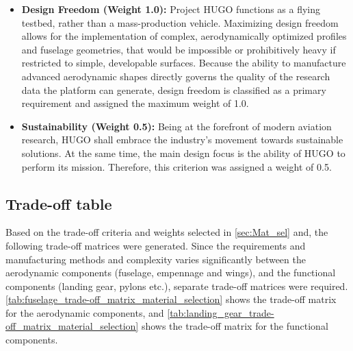 \begin{itemize}
    \item \textbf{Design Freedom (Weight 1.0):} Project HUGO functions as a flying testbed, rather than a mass-production vehicle. Maximizing design freedom allows for the implementation of complex, aerodynamically optimized profiles and fuselage geometries, that would be impossible or prohibitively heavy if restricted to simple, developable surfaces. Because the ability to manufacture advanced aerodynamic shapes directly governs the quality of the research data the platform can generate, design freedom is classified as a primary requirement and assigned the maximum weight of 1.0.

    \item \textbf{Sustainability (Weight 0.5):} Being at the forefront of modern aviation research, HUGO shall embrace the industry's movement towards sustainable solutions. At the same time, the main design focus is the ability of HUGO to perform its mission. Therefore, this criterion was assigned a weight of 0.5.
    \end{itemize}

\subsection{Trade-off table}

Based on the trade-off criteria and weights selected in \autoref{sec:Mat_sel} and, the following trade-off matrices were generated. Since the requirements and manufacturing methods and complexity varies significantly between the aerodynamic components (fuselage, empennage and wings), and the functional components (landing gear, pylons etc.), separate trade-off matrices were required. \autoref{tab:fuselage_trade-off_matrix_material_selection} shows the trade-off matrix for the aerodynamic components, and \autoref{tab:landing_gear_trade-off_matrix_material_selection} shows the trade-off matrix for the functional components. 

